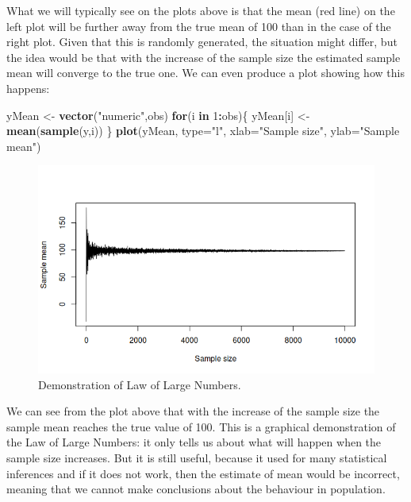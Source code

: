 \documentclass[
]{book}
\newenvironment{Shaded}{\begin{snugshade}}{\end{snugshade}}
\newcommand{\AttributeTok}[1]{\textcolor[rgb]{0.13,0.29,0.53}{#1}}
\newcommand{\ControlFlowTok}[1]{\textcolor[rgb]{0.13,0.29,0.53}{\textbf{#1}}}
\newcommand{\DecValTok}[1]{\textcolor[rgb]{0.00,0.00,0.81}{#1}}
\newcommand{\FunctionTok}[1]{\textcolor[rgb]{0.13,0.29,0.53}{\textbf{#1}}}
\newcommand{\NormalTok}[1]{#1}
\newcommand{\OtherTok}[1]{\textcolor[rgb]{0.56,0.35,0.01}{#1}}
\newcommand{\SpecialCharTok}[1]{\textcolor[rgb]{0.81,0.36,0.00}{\textbf{#1}}}
\newcommand{\StringTok}[1]{\textcolor[rgb]{0.31,0.60,0.02}{#1}}
\theoremstyle{definition}
\theoremstyle{definition}
\theoremstyle{definition}
\theoremstyle{definition}
\theoremstyle{remark}
\begin{document}
What we will typically see on the plots above is that the mean (red line) on the left plot will be further away from the true mean of 100 than in the case of the right plot. Given that this is randomly generated, the situation might differ, but the idea would be that with the increase of the sample size the estimated sample mean will converge to the true one. We can even produce a plot showing how this happens:

\begin{Shaded}
\begin{Highlighting}[]
\NormalTok{yMean }\OtherTok{\textless{}{-}} \FunctionTok{vector}\NormalTok{(}\StringTok{"numeric"}\NormalTok{,obs)}
\ControlFlowTok{for}\NormalTok{(i }\ControlFlowTok{in} \DecValTok{1}\SpecialCharTok{:}\NormalTok{obs)\{}
\NormalTok{    yMean[i] }\OtherTok{\textless{}{-}} \FunctionTok{mean}\NormalTok{(}\FunctionTok{sample}\NormalTok{(y,i))}
\NormalTok{\}}
\FunctionTok{plot}\NormalTok{(yMean, }\AttributeTok{type=}\StringTok{"l"}\NormalTok{, }\AttributeTok{xlab=}\StringTok{"Sample size"}\NormalTok{, }\AttributeTok{ylab=}\StringTok{"Sample mean"}\NormalTok{)}
\end{Highlighting}
\end{Shaded}

\begin{figure}
\includegraphics[width=9.72in]{images/02-statistics-LLN} \caption{Demonstration of Law of Large Numbers.}\label{fig:statsSampleMean}
\end{figure}

We can see from the plot above that with the increase of the sample size the sample mean reaches the true value of 100. This is a graphical demonstration of the Law of Large Numbers: it only tells us about what will happen when the sample size increases. But it is still useful, because it used for many statistical inferences and if it does not work, then the estimate of mean would be incorrect, meaning that we cannot make conclusions about the behaviour in population.
\end{document}
